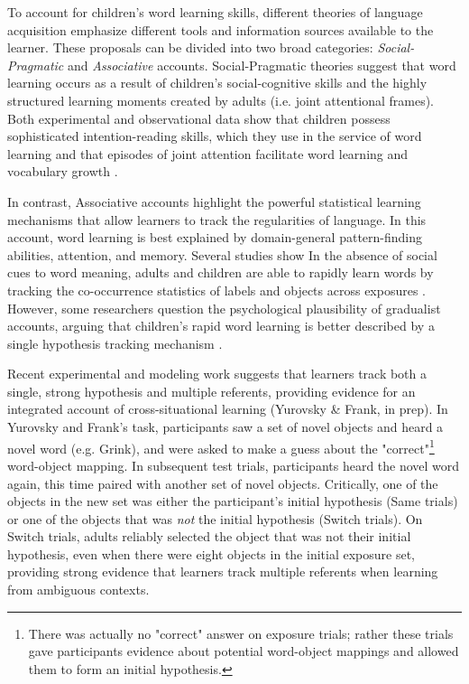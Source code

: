 \documentclass[10pt,letterpaper]{article}
\begin{document}
To account for children's word learning skills, different theories of language acquisition emphasize different tools and information sources available to the learner. These proposals can be divided into two broad categories: \emph{Social-Pragmatic} and \emph{Associative} accounts. Social-Pragmatic theories suggest that word learning occurs as a result of children's social-cognitive skills and the highly structured learning moments created by adults (i.e. joint attentional frames).  Both experimental and observational data show that children possess sophisticated intention-reading skills, which they use in the service of word learning \cite{baldwin1993infants} and that episodes of joint attention facilitate word learning and vocabulary growth \cite{brooks2008infant}.  

In contrast, Associative accounts highlight the powerful statistical learning mechanisms that allow learners to track the regularities of language. In this account, word learning is best explained by domain-general pattern-finding abilities, attention, and memory. Several studies show In the absence of social cues to word meaning, adults and children are able to rapidly learn words by tracking the co-occurrence statistics of labels and objects across exposures \cite{smith2008infants,vouloumanos2008fine}. However, some researchers question the psychological plausibility of gradualist accounts, arguing that children's rapid word learning is better described by a single hypothesis tracking mechanism \cite{trueswell2013propose,medina2011words}. 

Recent experimental and modeling work suggests that learners track both a single, strong hypothesis and multiple referents, providing evidence for an integrated account of cross-situational learning (Yurovsky & Frank, in prep). In Yurovsky and Frank's task, participants saw a set of novel objects and heard a novel word (e.g. Grink), and were asked to make a guess about the "correct"\footnote{There was actually no "correct" answer on exposure trials; rather these trials gave participants evidence about potential word-object mappings and allowed them to form an initial hypothesis.} word-object mapping. In subsequent test trials, participants heard the novel word again, this time paired with another set of novel objects. Critically, one of the objects in the new set was either the participant's initial hypothesis (Same trials) or one of the objects that was \emph{not} the initial hypothesis (Switch trials). On Switch trials, adults reliably selected the object that was not their initial hypothesis, even when there were eight objects in the initial exposure set, providing strong evidence that learners track multiple referents when learning from ambiguous contexts.
\end{document}
